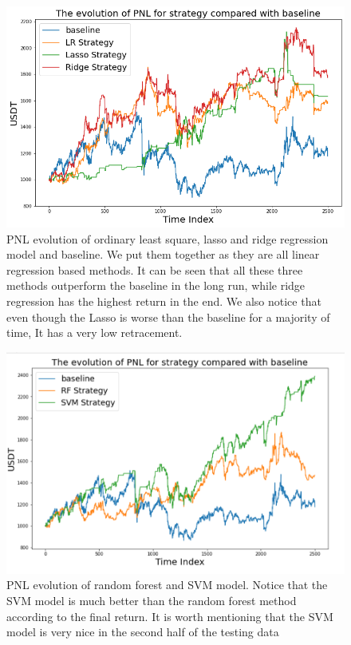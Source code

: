 \documentclass[twoside]{report}
\begin{document}
\begin{spacing}{1}
\begin{figure}
    \centering
    \includegraphics[scale = 0.528]{Images/pnl for linear regression.png}
    \caption{PNL evolution of ordinary least square, lasso and ridge regression model and baseline. We put them together as they are all linear regression based methods. It can be seen that all these three methods outperform the baseline in the long run, while ridge regression has the highest return in the end. We also notice that even though the Lasso is worse than the baseline for a majority of time, It has a very low retracement.  }
    \label{fig:LR PNL}
\end{figure}



\begin{figure}
    \centering
    \includegraphics[scale = 0.6]{Images/PNL SVM RF.png}
    \caption{PNL evolution of random forest and SVM model. Notice that the SVM model is much better than the random forest method according to the final return. It is worth mentioning that the SVM model is very nice in the second half of the testing data}
    \label{fig:SVMRF PNL}
\end{figure}





\end{spacing}
\end{document}
